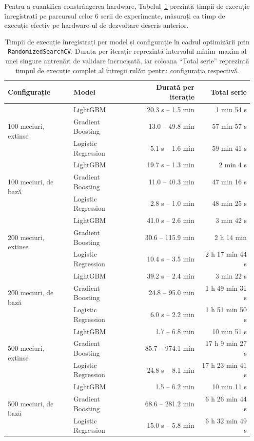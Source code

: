 Pentru a cuantifica constrângerea hardware, Tabelul~\ref{tab:timpi}
prezintă timpii de execuție înregistrați pe parcursul celor 6 serii de
experimente, măsurați ca timp de execuție efectiv pe hardware-ul de
dezvoltare descris anterior.

\begin{table}[htbp]
\centering
\small
\begin{tabular}{|l|l|r|r|}
\hline
\textbf{Configurație} & \textbf{Model} & \textbf{Durată per iterație}
& \textbf{Total serie} \\
\hline
\multirow{3}{*}{100 meciuri, extinse}
  & LightGBM            & 20.3 s -- 1.5 min  & 1 min 54 s \\
  & Gradient Boosting   & 13.0 -- 49.8 min  & 57 min 57 s \\
  & Logistic Regression & 5.1 s -- 1.6 min   & 59 min 41 s \\
\hline
\multirow{3}{*}{100 meciuri, de bază}
  & LightGBM            & 19.7 s -- 1.3 min  & 2 min 4 s \\
  & Gradient Boosting   & 11.0 -- 40.3 min  & 47 min 16 s \\
  & Logistic Regression & 2.8 s -- 1.0 min   & 48 min 25 s \\
\hline
\multirow{3}{*}{200 meciuri, extinse}
  & LightGBM            & 41.0 s -- 2.6 min  & 3 min 42 s \\
  & Gradient Boosting   & 30.6 -- 115.9 min & 2 h 14 min \\
  & Logistic Regression & 10.4 s -- 3.5 min  & 2 h 17 min 44 s \\
\hline
\multirow{3}{*}{200 meciuri, de bază}
  & LightGBM            & 39.2 s -- 2.4 min  & 3 min 22 s \\
  & Gradient Boosting   & 24.8 -- 95.0 min  & 1 h 49 min 31 s \\
  & Logistic Regression & 6.0 s -- 2.2 min   & 1 h 51 min 50 s \\
\hline
\multirow{3}{*}{500 meciuri, extinse}
  & LightGBM            & 1.7 -- 6.8 min    & 10 min 51 s \\
  & Gradient Boosting   & 85.7 -- 974.1 min & 17 h 9 min 27 s \\
  & Logistic Regression & 24.8 s -- 8.1 min  & 17 h 23 min 41 s \\
\hline
\multirow{3}{*}{500 meciuri, de bază}
  & LightGBM            & 1.5 -- 6.2 min    & 10 min 11 s \\
  & Gradient Boosting   & 68.6 -- 281.2 min & 6 h 26 min 44 s \\
  & Logistic Regression & 15.0 s -- 5.8 min  & 6 h 32 min 49 s \\
\hline
\end{tabular}
\caption{Timpii de execuție înregistrați per model și configurație în
         cadrul optimizării prin \texttt{RandomizedSearchCV}. Durata per
         iterație reprezintă intervalul minim--maxim al unei singure
         antrenări de validare încrucișată, iar coloana ``Total serie''
         reprezintă timpul de execuție complet al întregii rulări pentru
         configurația respectivă.}
\label{tab:timpi}
\end{table}

